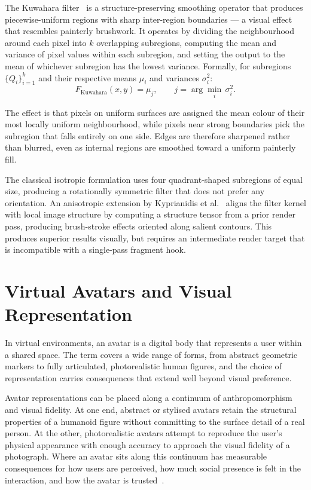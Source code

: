 The Kuwahara filter~\cite{kyprianidis2009} is a structure-preserving smoothing operator that produces piecewise-uniform regions with sharp inter-region boundaries — a visual effect that resembles painterly brushwork. It operates by dividing the neighbourhood around each pixel into $k$ overlapping subregions, computing the mean and variance of pixel values within each subregion, and setting the output to the mean of whichever subregion has the lowest variance. Formally, for subregions $\{Q_i\}_{i=1}^{k}$ and their respective means $\mu_i$ and variances $\sigma_i^2$:
\begin{equation}
  F_{\text{Kuwahara}}(x, y) = \mu_j, \qquad j = \arg\min_i \, \sigma_i^2.
  \label{eq:kuwahara}
\end{equation}

The effect is that pixels on uniform surfaces are assigned the mean colour of their most locally uniform neighbourhood, while pixels near strong boundaries pick the subregion that falls entirely on one side. Edges are therefore sharpened rather than blurred, even as internal regions are smoothed toward a uniform painterly fill.

The classical isotropic formulation uses four quadrant-shaped subregions of equal size, producing a rotationally symmetric filter that does not prefer any orientation. An anisotropic extension by Kyprianidis et al.~\cite{kyprianidis2009} aligns the filter kernel with local image structure by computing a structure tensor from a prior render pass, producing brush-stroke effects oriented along salient contours. This produces superior results visually, but requires an intermediate render target that is incompatible with a single-pass fragment hook.

\section{Virtual Avatars and Visual Representation}
\label{sec:background_avatars}

In virtual environments, an avatar is a digital body that represents a user within a shared space. The term covers a wide range of forms, from abstract geometric markers to fully articulated, photorealistic human figures, and the choice of representation carries consequences that extend well beyond visual preference.

Avatar representations can be placed along a continuum of anthropomorphism and visual fidelity. At one end, abstract or stylised avatars retain the structural properties of a humanoid figure without committing to the surface detail of a real person. At the other, photorealistic avatars attempt to reproduce the user's physical appearance with enough accuracy to approach the visual fidelity of a photograph. Where an avatar sits along this continuum has measurable consequences for how users are perceived, how much social presence is felt in the interaction, and how the avatar is trusted~\cite{latoschik2017, nowak2003}.

